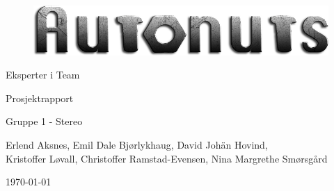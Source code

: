 \begin{titlepage}
\begin{center}
\vspace*{1in}
\begin{figure}[H]
		\centering
		\includegraphics[width=1.00\textwidth]{images/logo.png}
		\label{fig:logo}
	\end{figure}
\vspace{3in}
{\LARGE Eksperter i Team}
\par
\vspace{0.2in}
{\LARGE Prosjektrapport}
\par
\vspace{0.2in}
{\Large Gruppe 1 - Stereo}
\par
\vfill
\par
\vspace{0.1in}
Erlend Aksnes, Emil Dale Bjørlykhaug, David Johän Hovind, \\Kristoffer Løvall, Christoffer Ramstad-Evensen, Nina Margrethe Smørsgård
\par
\vspace{0.4cm}
\today
\end{center}
\end{titlepage}
